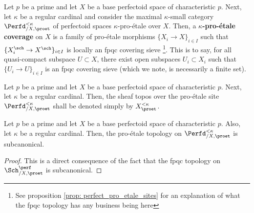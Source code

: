                 \begin{definition} \label{def: pro_etale_topology_on_perfectoid_spaces}
                    Let $p$ be a prime and let $X$ be a base perfectoid space of characteristic $p$. Next, let $\kappa$ be a regular cardinal and consider the maximal $\kappa$-small category $\Perfd_{/X, \proet}^{< \kappa}$ of perfectoid spaces $\kappa$-pro-\'etale over $X$. Then, a \textbf{$\kappa$-pro-\'etale coverage} on $X$ is a family of pro-\'etale morphisms $\{X_i \to X\}_{i \in I}$ such that $\{X_i^{\sch} \to X^{\sch}\}_{i \in I}$ is locally an fpqc covering sieve \footnote{See proposition \ref{prop: perfect_pro_etale_sites} for an explanation of what the fpqc topology has any business being here}. This is to say, for all quasi-compact subspace $U \subset X$, there exist open subspaces $U_i \subset X_i$ such that $\{U_i \to U\}_{i \in I}$ is an fpqc covering sieve (which we note, is necessarily a finite set).
                \end{definition}
                \begin{convention}
                    Let $p$ be a prime and let $X$ be a base perfectoid space of characteristic $p$. Next, let $\kappa$ be a regular cardinal. Then, the sheaf topos over the pro-\'etale site $\Perfd_{/X, \proet}^{< \kappa}$ shall be denoted simply by $X_{\proet}^{< \kappa}$.
                \end{convention}
                
                \begin{proposition}
                    Let $p$ be a prime and let $X$ be a base perfectoid space of characteristic $p$. Also, let $\kappa$ be a regular cardinal. Then, the pro-\'etale topology on $\Perfd_{/X, \proet}^{< \kappa}$ is subcanonical.
                \end{proposition}
                    \begin{proof}
                        This is a direct consequence of the fact that the fpqc topology on $\Sch^{\perf}_{/X, \proet}$ is subcanonical.
                    \end{proof}
